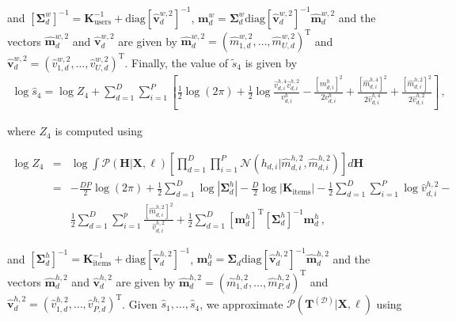 \documentclass{article}
\begin{document}
and $[ \bm \Sigma_d^w]^{-1} = \mathbf{K}^{-1}_\text{users} + \text{diag}[\hat{\mathbf{v}}_d^{w,2}]^{-1}$,
$\mathbf{m}_d^w = \bm \Sigma_d^w \text{diag}[\hat{\mathbf{v}}_d^{w,2}]^{-1} \hat{\mathbf{m}}_d^{w,2}$
and the vectors $\hat{\mathbf{m}}_d^{w,2}$ and $\hat{\mathbf{v}}_d^{w,2}$ are given by
$\hat{\mathbf{m}}_d^{w,2}=(\hat{m}_{1,d}^{w,2},\ldots,\hat{m}_{U,d}^{w,2})^\text{T}$ and
$\hat{\mathbf{v}}_d^{w,2}=(\hat{v}_{1,d}^{w,2},\ldots,\hat{v}_{U,d}^{w,2})^\text{T}$.
Finally, the value of $\tilde{s}_{4}$ is given by
\begin{align}
\log\hat{s}_4 = \log Z_4 + \sum_{d=1}^{D}\sum_{i=1}^{P}\left[
\frac{1}{2}\log(2\pi)+\frac{1}{2}\log \frac{\hat{v}_{d,i}^{h,4} \hat{v}_{d,i}^{h,2}}{v_{d,i}^h}-
\frac{[m_{d,i}^h]^2}{2v_{d,i}^h}+\frac{[\hat{m}_{d,i}^{h,4}]^2}{2\hat{v}_{d,i}^{h,4}}+
\frac{[\hat{m}_{d,i}^{h,2}]^2}{2\hat{v}_{d,i}^{h,2}}\right]\,,
\end{align}

where $Z_4$ is computed using

\begin{eqnarray}
\log Z_{4}  & = & \log \int \mathcal{P}(\mathbf{H}|\mathbf{X},\ell)\left[\prod_{d=1}^{D}\prod_{i=1}^{P}
\mathcal{N}(h_{d,i}|\hat{m}_{d,i}^{h,2},\hat{m}_{d,i}^{h,2})\right]d\mathbf{H}\nonumber\\
& = & -\frac{DP}{2}\log(2\pi) + \frac{1}{2}\sum_{d=1}^D\log|\bm \Sigma_d^h| -
\frac{D}{2}\log|\mathbf{K}_\text{items}| - \frac{1}{2} \sum_{d=1}^D\sum_{i=1}^P \log \hat{v}_{d,i}^{h,2} - \nonumber \\
& & \frac{1}{2} \sum_{d=1}^D\sum_{i=1}^p \frac{[\hat{m}_{d,i}^{h,2}]^2}{\hat{v}_{d,i}^{h,2}} +
\frac{1}{2} \sum_{d=1}^D [\mathbf{m}_d^h]^\text{T} [\bm \Sigma_d^h]^{-1} \mathbf{m}_d^h\,,\label{eq:Z4}
\end{eqnarray}

and $[\bm \Sigma_d^h]^{-1} = \mathbf{K}^{-1}_\text{items} + \text{diag}[\hat{\mathbf{v}}_d^{h,2}]^{-1}$,
$\mathbf{m}_d^h = \bm \Sigma_d \text{diag}[\hat{\mathbf{v}}_d^{h,2}]^{-1} \hat{\mathbf{m}}_d^{h,2}$
and the vectors $\hat{\mathbf{m}}_d^{h,2}$ and $\hat{\mathbf{v}}_d^{h,2}$ are given by
$\hat{\mathbf{m}}_d^{h,2}=(\hat{m}_{1,d}^{h,2},\ldots,\hat{m}_{P,d}^{h,2})^\text{T}$ and
$\hat{\mathbf{v}}_d^{h,2}=(\hat{v}_{1,d}^{h,2},\ldots,\hat{v}_{P,d}^{h,2})^\text{T}$.
Given $\hat{s}_1,\ldots,\hat{s}_4$, we approximate $\mathcal{P}(\mathbf{T}^{(\mathcal{D})}|\mathbf{X},\ell)$ using
\end{document}
